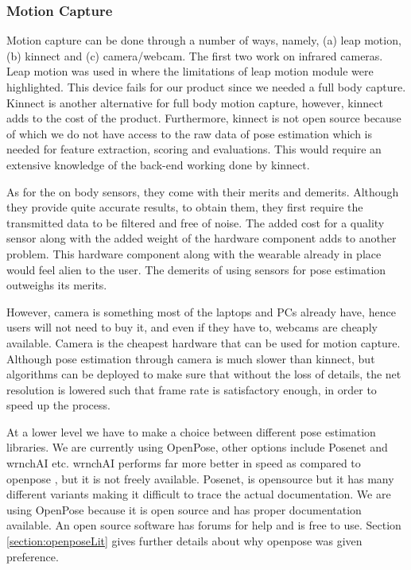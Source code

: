 \subsubsection{Motion Capture}

Motion capture can be done through a number of ways, namely, (a) leap motion, (b) kinnect and (c) camera/webcam. The first two work on infrared cameras. Leap motion was used in \cite{Dexmo} where the limitations of leap motion module were highlighted. This device fails for our product since we needed a full body capture. Kinnect is another alternative for full body motion capture, however, kinnect adds to the cost of the product. Furthermore, kinnect is not open source because of which we do not have access to the raw data of pose estimation which is needed for feature extraction, scoring and evaluations. This would require an extensive knowledge of the back-end working done by kinnect.


As for the on body sensors, they come with their merits and demerits. Although they provide quite accurate results, to obtain them, they first require the transmitted data to be filtered and free of noise. The added cost for a quality sensor along with the added weight of the hardware component adds to another problem. This hardware component along with the wearable already in place would feel alien to the user. The demerits of using sensors for pose estimation outweighs its merits.


However, camera is something most of the laptops and PCs already have, hence users will not need to buy it, and even if they have to, webcams are cheaply available. Camera is the cheapest hardware that can be used for motion capture. Although pose estimation through camera is much slower than kinnect, but algorithms can be deployed to make sure that without the loss of details, the net resolution is lowered such that frame rate is satisfactory enough, in order to speed up the process. 

At a lower level we have to make a choice between different pose estimation libraries. We are currently using OpenPose, other options include Posenet and wrnchAI etc. wrnchAI performs far more better in speed as compared to openpose \cite{wrnchAI}, but it is not freely available. Posenet, is opensource but it has many different variants making it difficult to trace the actual documentation. We are using OpenPose because it is open source and has proper documentation available. An open source software has forums for help and is free to use. Section \ref{section:openposeLit} gives further details about why openpose was given preference.


